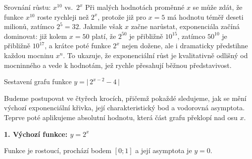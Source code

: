 \documentclass[12pt,a4paper]{article}
\begin{document}
\bigskip
\begin{notebox}{Srovnání růstu: $x^{10}$ vs.\ $2^{x}$}
Při malých hodnotách proměnné $x$ se může zdát, že funkce $x^{10}$ roste rychleji než $2^{x}$,
protože již pro $x=5$ má hodnotu téměř deseti milionů, zatímco $2^{5}=32$.
Jakmile však $x$ začne narůstat, exponenciála začíná dominovat: již kolem $x=50$
platí, že $2^{50}$ je přibližně $10^{15}$, zatímco $50^{10}$ je přibližně $10^{17}$,
a krátce poté funkce $2^{x}$ nejen dožene, ale i dramaticky předstihne každou mocninu $x^{n}$.
To ukazuje, že exponenciální růst je kvalitativně odlišný od mocninného a vede k hodnotám,
jež rychle přesahují běžnou představivost.
\end{notebox}

\bigskip
\begin{examplebox}{Sestavení grafu funkce $y = \big|\,2^{x-2} - 4\,\big|$}

Budeme postupovat ve čtyřech krocích, přičemž pokaždé sledujeme,
jak se mění výchozí exponenciální křivka, její charakteristický bod
a vodorovná asymptota. Teprve poté aplikujeme absolutní hodnotu,
která část grafu překlopí nad osu $x$.

\textbf{1. Výchozí funkce: $y=2^{x}$}

Funkce je rostoucí, prochází bodem $[0;1]$ a její asymptota je $y=0$.

\begin{center}
\end{center}



\end{examplebox}
\end{document}
